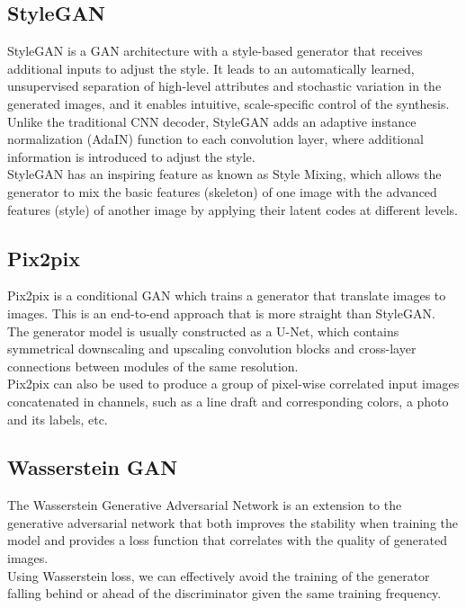 \documentclass[letterpaper]{article}
\begin{document}
\subsection{StyleGAN}
StyleGAN is a GAN architecture with a style-based generator that receives additional inputs to adjust the style. It leads to an automatically learned, unsupervised separation of high-level attributes and stochastic variation in the generated images, and it enables intuitive, scale-specific control of the synthesis.
\\
Unlike the traditional CNN decoder, StyleGAN adds an adaptive instance normalization (AdaIN) function to each convolution layer, where additional information is introduced to adjust the style.
\\
StyleGAN has an inspiring feature as known as Style Mixing, which allows the generator to mix the basic features (skeleton) of one image with the advanced features (style) of another image by applying their latent codes at different levels.

\subsection{Pix2pix}
Pix2pix is a conditional GAN which trains a generator that translate images to images. This is an end-to-end approach that is more straight than StyleGAN.
\\
The generator model is usually constructed as a U-Net, which contains symmetrical downscaling and upscaling convolution blocks and cross-layer connections between modules of the same resolution.
\\
Pix2pix can also be used to produce a group of pixel-wise correlated input images concatenated in channels, such as a line draft and corresponding colors, a photo and its labels, etc. 

\subsection{Wasserstein GAN}
The Wasserstein Generative Adversarial Network is an extension to the generative adversarial network that both improves the stability when training the model and provides a loss function that correlates with the quality of generated images.
\\
Using Wasserstein loss, we can effectively avoid the training of the generator falling behind or ahead of the discriminator given the same training frequency.
\end{document}
